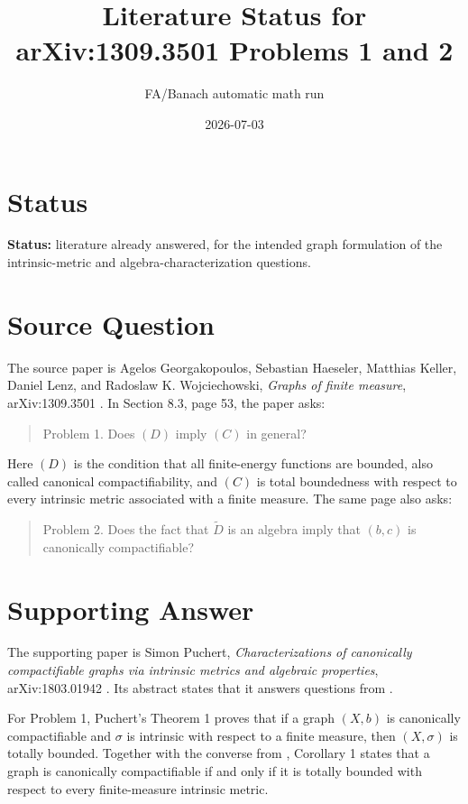 \documentclass[11pt]{article}
\title{Literature Status for arXiv:1309.3501 Problems 1 and 2}
\author{FA/Banach automatic math run}
\date{2026-07-03}
\begin{document}
\maketitle

\section*{Status}

\textbf{Status:} literature already answered, for the intended graph
formulation of the intrinsic-metric and algebra-characterization questions.

\section*{Source Question}

The source paper is Agelos Georgakopoulos, Sebastian Haeseler, Matthias
Keller, Daniel Lenz, and Radoslaw K. Wojciechowski, \emph{Graphs of finite
measure}, arXiv:1309.3501 \cite{GHKLW}. In Section 8.3, page 53, the paper
asks:
\begin{quote}
Problem 1. Does $(D)$ imply $(C)$ in general?
\end{quote}
Here $(D)$ is the condition that all finite-energy functions are bounded, also
called canonical compactifiability, and $(C)$ is total boundedness with respect
to every intrinsic metric associated with a finite measure. The same page also
asks:
\begin{quote}
Problem 2. Does the fact that $\widetilde D$ is an algebra imply that $(b,c)$
is canonically compactifiable?
\end{quote}

\section*{Supporting Answer}

The supporting paper is Simon Puchert, \emph{Characterizations of canonically
compactifiable graphs via intrinsic metrics and algebraic properties},
arXiv:1803.01942 \cite{Puchert}. Its abstract states that it answers questions
from \cite{GHKLW}.

For Problem 1, Puchert's Theorem 1 proves that if a graph $(X,b)$ is
canonically compactifiable and $\sigma$ is intrinsic with respect to a finite
measure, then $(X,\sigma)$ is totally bounded. Together with the converse from
\cite{GHKLW}, Corollary 1 states that a graph is canonically compactifiable if
and only if it is totally bounded with respect to every finite-measure
intrinsic metric.
\end{document}

